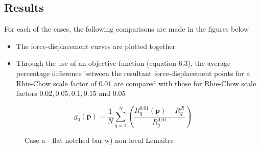 \documentclass[sn-mathphys,Numbered,draft]{sn-jnl}%
\begin{document}
\subsection{Results}

For each of the cases, the following comparisons are made in the figures below
\begin{itemize}
    \item The force-displacement curves are plotted together
    \item  Through the use of an objective function (equation 6.3), the average percentage difference between the resultant force-displacement points for a Rhie-Chow scale factor of $0.01$ are compared with those for Rhie-Chow scale factors $0.02,0.05,0.1,0.15$ and $0.05$
\end{itemize}
\begin{equation}
g_0(\boldsymbol{p})=\frac{1}{N} \sum_{q=1}^N\left(\frac{R_q^{0.01}(\boldsymbol{p})-R_q^{\mathcal{R}}}{R_q^{0.01}}\right)
\end{equation}

\begin{figure}[t!]
	\centering
		\qquad
	
	\caption{Case a - flat notched bar w) non-local Lemaitre}
	\label{label_for_entire_figure}
\end{figure}
\end{document}

